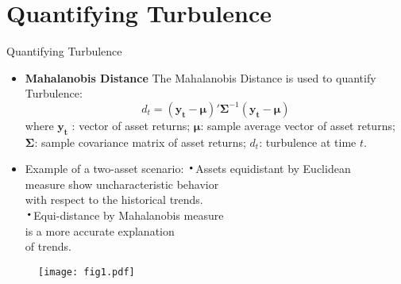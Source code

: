 \documentclass{beamer}
\newcommand*{\LargerCdot}{\raisebox{-0.25ex}{\scalebox{2.3}{$\cdot$}}}
\begin{document}
\section{Quantifying Turbulence}
\begin{frame}{Quantifying Turbulence}{}
	\begin{itemize}
		\item{\textbf{Mahalanobis Distance}}\newline
		The \alert{Mahalanobis Distance} is used to quantify Turbulence:
		$$
		d_{t} = (\mathbf{y_{t}} - \mathbf{\mu})' \mathbf{\Sigma}^{-1} (\mathbf{y_{t}} - \mathbf{\mu})
		$$ where
		$\mathbf{y_{t}}$ : vector of asset returns;\newline
		\hspace*{0.51 in}$\mathbf{\mu}$: sample average vector of asset 	returns;\newline
		\hspace*{0.485 in}$\mathbf{\Sigma}$: sample covariance matrix of asset returns;\newline
		\hspace*{0.47 in}$d_{t}$: turbulence at time $t$.
		\vspace{0.1in}
		\item{Example of a two-asset scenario:} \newline
		$\LargerCdot$Assets equidistant by Euclidean \\measure show uncharacteristic behavior\\ with respect to the historical trends.\\
		$\LargerCdot$Equi-distance by Mahalanobis measure \\is a more accurate explanation \\of trends.    
	\end{itemize}

	\begin{figure}{}
		\vspace*{-5.0 cm}
		\scalebox{0.5}
		{\hspace*{5.7in}\texttt{[image: fig1.pdf]} }
	\end{figure}
\end{frame}
\end{document}
